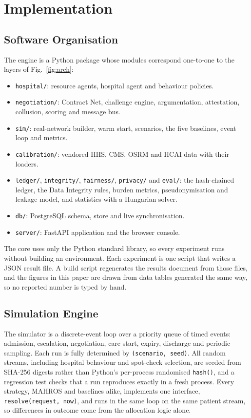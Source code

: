 \section{Implementation}
\label{sec:implementation}

\subsection{Software Organisation}
The engine is a Python package whose modules correspond one-to-one to the layers of Fig.~\ref{fig:arch}:
\begin{itemize}
\setlength{\itemsep}{1pt}
\item \texttt{hospital/}: resource agents, hospital agent and behaviour policies.
\item \texttt{negotiation/}: Contract Net, challenge engine, argumentation, attestation, collusion, scoring and message bus.
\item \texttt{sim/}: real-network builder, warm start, scenarios, the five baselines, event loop and metrics.
\item \texttt{calibration/}: vendored HHS, CMS, OSRM and HCAI data with their loaders.
\item \texttt{ledger/}, \texttt{integrity/}, \texttt{fairness/}, \texttt{privacy/} and \texttt{eval/}: the hash-chained ledger, the Data Integrity rules, burden metrics, pseudonymisation and leakage model, and statistics with a Hungarian solver.
\item \texttt{db/}: PostgreSQL schema, store and live synchronisation.
\item \texttt{server/}: FastAPI application and the browser console.
\end{itemize}
The core uses only the Python standard library, so every experiment runs without building an environment. Each experiment is one script that writes a JSON result file. A build script regenerates the results document from those files, and the figures in this paper are drawn from data tables generated the same way, so no reported number is typed by hand.

\subsection{Simulation Engine}
The simulator is a discrete-event loop over a priority queue of timed events: admission, escalation, negotiation, care start, expiry, discharge and periodic sampling. Each run is fully determined by \texttt{(scenario, seed)}. All random streams, including hospital behaviour and spot-check selection, are seeded from SHA-256 digests rather than Python's per-process randomised \texttt{hash()}, and a regression test checks that a run reproduces exactly in a fresh process. Every strategy, MAHROS and baselines alike, implements one interface, \texttt{resolve(request, now)}, and runs in the same loop on the same patient stream, so differences in outcome come from the allocation logic alone.

